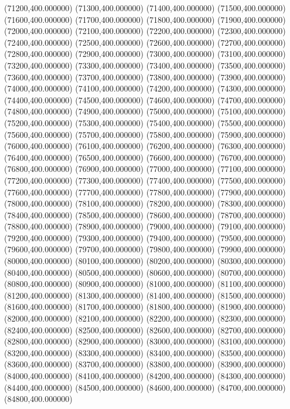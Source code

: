(71200,400.000000)
(71300,400.000000)
(71400,400.000000)
(71500,400.000000)
(71600,400.000000)
(71700,400.000000)
(71800,400.000000)
(71900,400.000000)
(72000,400.000000)
(72100,400.000000)
(72200,400.000000)
(72300,400.000000)
(72400,400.000000)
(72500,400.000000)
(72600,400.000000)
(72700,400.000000)
(72800,400.000000)
(72900,400.000000)
(73000,400.000000)
(73100,400.000000)
(73200,400.000000)
(73300,400.000000)
(73400,400.000000)
(73500,400.000000)
(73600,400.000000)
(73700,400.000000)
(73800,400.000000)
(73900,400.000000)
(74000,400.000000)
(74100,400.000000)
(74200,400.000000)
(74300,400.000000)
(74400,400.000000)
(74500,400.000000)
(74600,400.000000)
(74700,400.000000)
(74800,400.000000)
(74900,400.000000)
(75000,400.000000)
(75100,400.000000)
(75200,400.000000)
(75300,400.000000)
(75400,400.000000)
(75500,400.000000)
(75600,400.000000)
(75700,400.000000)
(75800,400.000000)
(75900,400.000000)
(76000,400.000000)
(76100,400.000000)
(76200,400.000000)
(76300,400.000000)
(76400,400.000000)
(76500,400.000000)
(76600,400.000000)
(76700,400.000000)
(76800,400.000000)
(76900,400.000000)
(77000,400.000000)
(77100,400.000000)
(77200,400.000000)
(77300,400.000000)
(77400,400.000000)
(77500,400.000000)
(77600,400.000000)
(77700,400.000000)
(77800,400.000000)
(77900,400.000000)
(78000,400.000000)
(78100,400.000000)
(78200,400.000000)
(78300,400.000000)
(78400,400.000000)
(78500,400.000000)
(78600,400.000000)
(78700,400.000000)
(78800,400.000000)
(78900,400.000000)
(79000,400.000000)
(79100,400.000000)
(79200,400.000000)
(79300,400.000000)
(79400,400.000000)
(79500,400.000000)
(79600,400.000000)
(79700,400.000000)
(79800,400.000000)
(79900,400.000000)
(80000,400.000000)
(80100,400.000000)
(80200,400.000000)
(80300,400.000000)
(80400,400.000000)
(80500,400.000000)
(80600,400.000000)
(80700,400.000000)
(80800,400.000000)
(80900,400.000000)
(81000,400.000000)
(81100,400.000000)
(81200,400.000000)
(81300,400.000000)
(81400,400.000000)
(81500,400.000000)
(81600,400.000000)
(81700,400.000000)
(81800,400.000000)
(81900,400.000000)
(82000,400.000000)
(82100,400.000000)
(82200,400.000000)
(82300,400.000000)
(82400,400.000000)
(82500,400.000000)
(82600,400.000000)
(82700,400.000000)
(82800,400.000000)
(82900,400.000000)
(83000,400.000000)
(83100,400.000000)
(83200,400.000000)
(83300,400.000000)
(83400,400.000000)
(83500,400.000000)
(83600,400.000000)
(83700,400.000000)
(83800,400.000000)
(83900,400.000000)
(84000,400.000000)
(84100,400.000000)
(84200,400.000000)
(84300,400.000000)
(84400,400.000000)
(84500,400.000000)
(84600,400.000000)
(84700,400.000000)
(84800,400.000000)

